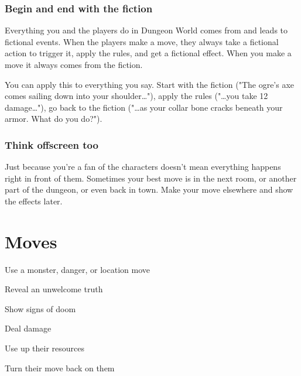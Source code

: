        
\subsubsection{Begin and end with the fiction}   
       

Everything you and the players do in Dungeon World comes from and leads to fictional events. When the players make a move, they always take a fictional action to trigger it, apply the rules, and get a fictional effect. When you make a move it always comes from the fiction.

       

You can apply this to everything you say. Start with the fiction ("The ogre's axe comes sailing down into your shoulder…"), apply the rules ("…you take 12 damage…"), go back to the fiction ("…as your collar bone cracks beneath your armor. What do you do?").

       
\subsubsection{Think offscreen too}   
       

Just because you're a fan of the characters doesn't mean everything happens right in front of them. Sometimes your best move is in the next room, or another part of the dungeon, or even back in town. Make your move elsewhere and show the effects later.

       
\section{Moves}   
       
\startitemize[1,packed]
         
\item Use a monster, danger, or location move

         
\item Reveal an unwelcome truth

         
\item Show signs of doom

         
\item Deal damage

         
\item Use up their resources

         
\item Turn their move back on them

